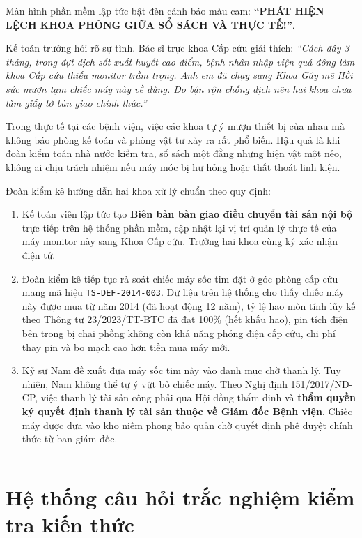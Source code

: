 \documentclass[12pt,a4paper]{article}
\begin{document}
Màn hình phần mềm lập tức bật đèn cảnh báo màu cam: \textbf{``PHÁT HIỆN LỆCH KHOA PHÒNG GIỮA SỔ SÁCH VÀ THỰC TẾ!''}.

Kế toán trưởng hỏi rõ sự tình. Bác sĩ trực khoa Cấp cứu giải thích: \textit{``Cách đây 3 tháng, trong đợt dịch sốt xuất huyết cao điểm, bệnh nhân nhập viện quá đông làm khoa Cấp cứu thiếu monitor trầm trọng. Anh em đã chạy sang Khoa Gây mê Hồi sức mượn tạm chiếc máy này về dùng. Do bận rộn chống dịch nên hai khoa chưa làm giấy tờ bàn giao chính thức.''}

Trong thực tế tại các bệnh viện, việc các khoa tự ý mượn thiết bị của nhau mà không báo phòng kế toán và phòng vật tư xảy ra rất phổ biến. Hậu quả là khi đoàn kiểm toán nhà nước kiểm tra, sổ sách một đằng nhưng hiện vật một nẻo, không ai chịu trách nhiệm nếu máy móc bị hư hỏng hoặc thất thoát linh kiện.

Đoàn kiểm kê hướng dẫn hai khoa xử lý chuẩn theo quy định:
\begin{enumerate}[leftmargin=*]
    \item Kế toán viên lập tức tạo \textbf{Biên bản bàn giao điều chuyển tài sản nội bộ} trực tiếp trên hệ thống phần mềm, cập nhật lại vị trí quản lý thực tế của máy monitor này sang Khoa Cấp cứu. Trưởng hai khoa cùng ký xác nhận điện tử.
    \item Đoàn kiểm kê tiếp tục rà soát chiếc máy sốc tim đặt ở góc phòng cấp cứu mang mã hiệu \texttt{TS-DEF-2014-003}. Dữ liệu trên hệ thống cho thấy chiếc máy này được mua từ năm 2014 (đã hoạt động 12 năm), tỷ lệ hao mòn tính lũy kế theo Thông tư 23/2023/TT-BTC đã đạt 100\% (hết khấu hao), pin tích điện bên trong bị chai phồng không còn khả năng phóng điện cấp cứu, chi phí thay pin và bo mạch cao hơn tiền mua máy mới.
    \item Kỹ sư Nam đề xuất đưa máy sốc tim này vào danh mục chờ thanh lý. Tuy nhiên, Nam không thể tự ý vứt bỏ chiếc máy. Theo Nghị định 151/2017/NĐ-CP, việc thanh lý tài sản công phải qua Hội đồng thẩm định và \textbf{thẩm quyền ký quyết định thanh lý tài sản thuộc về Giám đốc Bệnh viện}. Chiếc máy được đưa vào kho niêm phong bảo quản chờ quyết định phê duyệt chính thức từ ban giám đốc.
\end{enumerate}

\vspace{1.5em}
\hrule
\vspace{1.5em}

\section{Hệ thống câu hỏi trắc nghiệm kiểm tra kiến thức}
\end{document}
